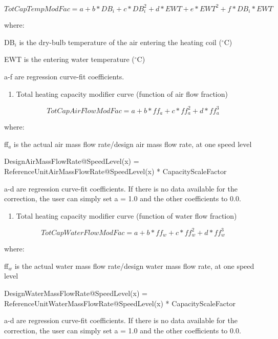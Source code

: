 \begin{equation}
TotCapTempModFac = a + b*D{B_i} + c*DB_i^2 + d*EWT + e*EW{T^2} + f*D{B_i}*EWT
\end{equation}

where:

DB\(_{i}\) is the dry-bulb temperature of the air entering the heating coil (\(^{\circ}\)C)

EWT is the entering water temperature (\(^{\circ}\)C)

a-f are regression curve-fit coefficients.

\begin{enumerate}
\def\labelenumi{\arabic{enumi})}
\setcounter{enumi}{1}
\tightlist
\item
  Total heating capacity modifier curve (function of air flow fraction)
\end{enumerate}

\begin{equation}
TotCapAirFlowModFac = a + b*f{f_a} + c*ff_a^2 + d*ff_a^3
\end{equation}

where:

ff\(_{a}\) is the actual air mass flow rate/design air mass flow rate, at one speed level

DesignAirMassFlowRate@SpeedLevel(x) = ReferenceUnitAirMassFlowRate@SpeedLevel(x) * CapacityScaleFactor

a-d are regression curve-fit coefficients.  If there is no data available for the correction, the user can simply set a = 1.0 and the other coefficients to 0.0.

\begin{enumerate}
\def\labelenumi{\arabic{enumi})}
\setcounter{enumi}{2}
\tightlist
\item
  Total heating capacity modifier curve (function of water flow fraction)
\end{enumerate}

\begin{equation}
TotCapWaterFlowModFac = a + b*f{f_w} + c*ff_w^2 + d*ff_w^3
\end{equation}

where:

ff\(_{w}\) is the actual water mass flow rate/design water mass flow rate, at one speed level

DesignWaterMassFlowRate@SpeedLevel(x) = ReferenceUnitWaterMassFlowRate@SpeedLevel(x) * CapacityScaleFactor

a-d are regression curve-fit coefficients.  If there is no data available for the correction, the user can simply set a = 1.0 and the other coefficients to 0.0.

